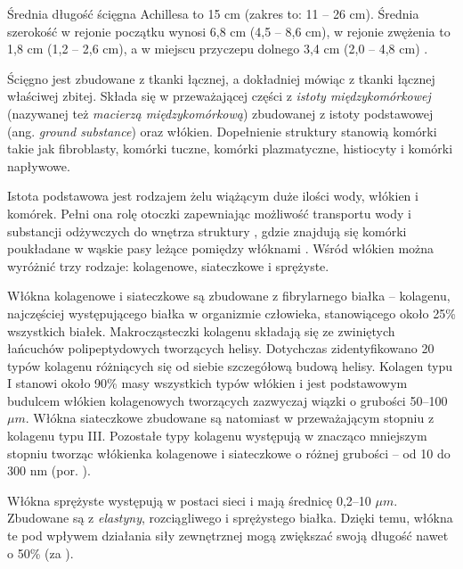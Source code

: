 Średnia długość ścięgna Achillesa to 15 cm (zakres to: 11 -- 26 cm). Średnia szerokość w rejonie początku wynosi 6,8 cm (4,5 -- 8,6 cm), w rejonie zwężenia \linebreak to 1,8 cm (1,2 -- 2,6 cm), a w miejscu przyczepu dolnego 3,4 cm (2,0 -- 4,8 cm) \cite{Doral2010, KoivunenNiemel1995}.

Ścięgno jest zbudowane z tkanki łącznej, a dokładniej mówiąc z tkanki łącznej właściwej zbitej. Składa się w przeważającej części z \textit{istoty międzykomórkowej} (nazywanej też \textit{macierzą międzykomórkową}) zbudowanej z istoty podstawowej (ang. \textit{ground substance}) oraz włókien. Dopełnienie struktury stanowią komórki takie jak fibroblasty, komórki tuczne, komórki plazmatyczne, histiocyty i komórki napływowe. 

Istota podstawowa jest rodzajem żelu wiążącym duże ilości wody, włókien i komórek. Pełni ona rolę otoczki zapewniając możliwość transportu wody i substancji odżywczych do wnętrza struktury \cite{Sharma2006}, gdzie znajdują się komórki poukładane \linebreak w wąskie pasy leżące pomiędzy włóknami \cite{Maffulli2005}. Wśród włókien można wyróżnić trzy rodzaje: kolagenowe, siateczkowe i sprężyste.

Włókna kolagenowe i siateczkowe są zbudowane z fibrylarnego białka -- kolagenu, najczęściej występującego białka w organizmie człowieka, stanowiącego około 25\% wszystkich białek. Makrocząsteczki kolagenu składają się ze zwiniętych łańcuchów polipeptydowych tworzących helisy. Dotychczas zidentyfikowano 20 typów kolagenu różniących się od siebie szczegółową budową helisy. Kolagen typu I stanowi około 90\% masy wszystkich typów włókien i jest podstawowym budulcem włókien kolagenowych tworzących zazwyczaj wiązki o grubości 50--100 $\mu$$m$. Włókna siateczkowe zbudowane są natomiast w przeważającym stopniu z kolagenu typu III. Pozostałe typy kolagenu występują w znacząco mniejszym stopniu tworząc włókienka kolagenowe i siateczkowe o różnej grubości -- od 10 do 300 nm (por. \cite{sawicki2008histologia}).

Włókna sprężyste występują w postaci sieci i mają średnicę 0,2--10 $\mu$$m$. Zbudowane są z \textit{elastyny}, rozciągliwego i sprężystego białka. Dzięki temu, włókna te pod wpływem działania siły zewnętrznej mogą zwiększać swoją długość nawet o 50\% (za \cite{sawicki2008histologia}). 

